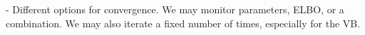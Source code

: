 \documentclass[a4paper,hidelinks]{article}\usepackage[]{graphicx}\usepackage[]{color}
\newcommand{\y}{\mathbf{y}}
\newcommand{\X}{\mathbf{X}}
\newcommand{\0}{\bm{0}}
\newcommand{\tr}{^{\text{T}}}
\newcommand{\trace}{\text{tr}}
\renewcommand{\(}{\left(}
\renewcommand{\)}{\right)}
\renewcommand{\[}{\left[}
\renewcommand{\]}{\right]}
\begin{document}
\begin{appendix}
		
		- Different options for convergence. We may monitor parameters, ELBO, or a combination. We may also iterate a fixed number of times, especially for the VB. 
		

\end{appendix}
\end{document}
